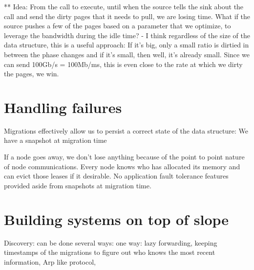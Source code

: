 ** Idea: From the call to execute, until when the source tells the sink about the call and send the
dirty pages that it needs to pull, we are losing time. What if the source pushes a few of the pages
based on a parameter that we optimize, to leverage the bandwidth during the idle time?
 - I think regardless of the size of the data structure, this is a useful approach: If it's big,
 only a small ratio is dirtied in between the phase changes and if it's small, then well, it's already small.
 Since we can send 100Gb/s = 100Mb/ms, this is even close to the rate at which we dirty the pages, we win.  

\section{Handling failures}
Migrations effectively allow us to persist a correct state of the data structure: We have a snapshot at migration time

If a node goes away, we don't lose anything because of the point to point
nature of node communications. Every node knows who has allocated its memory
and can evict those leases if it desirable. No application fault tolerance
features provided aside from snapshots at migration time.


\section{Building systems on top of slope}
Discovery: can be done several ways: one way: lazy forwarding, keeping timestamps
of the migrations to figure out who knows the most recent information, 
Arp like protocol, 
